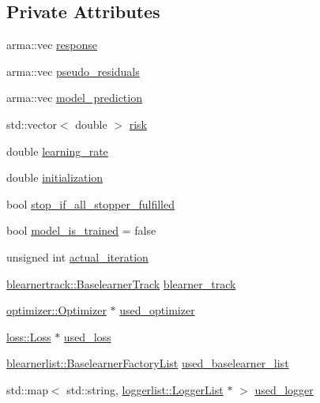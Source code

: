 \subsection*{Private Attributes}
\begin{DoxyCompactItemize}
\item 
arma\+::vec \mbox{\hyperlink{classcboost_1_1_compboost_a01de924b977c9ba12a3f3be88e2586e4}{response}}
\item 
arma\+::vec \mbox{\hyperlink{classcboost_1_1_compboost_acb8716c9e383e15ae7d8785a591860f7}{pseudo\+\_\+residuals}}
\item 
arma\+::vec \mbox{\hyperlink{classcboost_1_1_compboost_a7f7c7fe26c16c175e7d402aca781e8da}{model\+\_\+prediction}}
\item 
std\+::vector$<$ double $>$ \mbox{\hyperlink{classcboost_1_1_compboost_ab6ccd78f33c6843990bdc9e6c7f72518}{risk}}
\item 
double \mbox{\hyperlink{classcboost_1_1_compboost_aa6a7b77188ae60be668e87018d28835a}{learning\+\_\+rate}}
\item 
double \mbox{\hyperlink{classcboost_1_1_compboost_a2056c4035d5e0d8b0dcb4daedfadee16}{initialization}}
\item 
bool \mbox{\hyperlink{classcboost_1_1_compboost_a40c118dcaf96479cd6574138f9b2620f}{stop\+\_\+if\+\_\+all\+\_\+stopper\+\_\+fulfilled}}
\item 
bool \mbox{\hyperlink{classcboost_1_1_compboost_af1da66c1def3edd484f5d30b36e64eeb}{model\+\_\+is\+\_\+trained}} = false
\item 
unsigned int \mbox{\hyperlink{classcboost_1_1_compboost_a3db81c285c1cd238d0fb65dfc6c00439}{actual\+\_\+iteration}}
\item 
\mbox{\hyperlink{classblearnertrack_1_1_baselearner_track}{blearnertrack\+::\+Baselearner\+Track}} \mbox{\hyperlink{classcboost_1_1_compboost_af9c2787818f591941f74af0059ca7dc9}{blearner\+\_\+track}}
\item 
\mbox{\hyperlink{classoptimizer_1_1_optimizer}{optimizer\+::\+Optimizer}} $\ast$ \mbox{\hyperlink{classcboost_1_1_compboost_a6c0311a05cf6128b4c76fabbc432b807}{used\+\_\+optimizer}}
\item 
\mbox{\hyperlink{classloss_1_1_loss}{loss\+::\+Loss}} $\ast$ \mbox{\hyperlink{classcboost_1_1_compboost_a9c776faf5e9b9e99b5241f2a650d5242}{used\+\_\+loss}}
\item 
\mbox{\hyperlink{classblearnerlist_1_1_baselearner_factory_list}{blearnerlist\+::\+Baselearner\+Factory\+List}} \mbox{\hyperlink{classcboost_1_1_compboost_ac4c690473dc39e10e84ae9d9219b1fa1}{used\+\_\+baselearner\+\_\+list}}
\item 
std\+::map$<$ std\+::string, \mbox{\hyperlink{classloggerlist_1_1_logger_list}{loggerlist\+::\+Logger\+List}} $\ast$ $>$ \mbox{\hyperlink{classcboost_1_1_compboost_a05590928bf741eecb135f32da339ceaa}{used\+\_\+logger}}
\end{DoxyCompactItemize}


